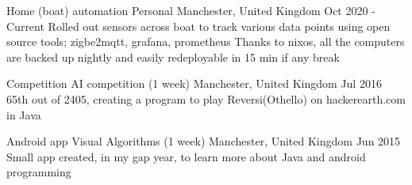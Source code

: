 \documentclass{my_cv}
\begin{document}


\experianceDetails
{Home (boat) automation}
{Personal}
{}
{Manchester, United Kingdom}
{Oct 2020 - Current}
\workdetails
{Rolled out sensors across boat to track various data points using open source tools; zigbe2mqtt, grafana, prometheus}
{Thanks to nixos, all the computers are backed up nightly and easily redeployable in 15 min if any break}
\stopworkdetails






\experianceDetails
{Competition}
{AI competition}
{(1 week)}
{Manchester, United Kingdom}
{Jul 2016}
\workdetails
{65th out of 2405, creating a program to play Reversi(Othello) on hackerearth.com in Java}
\stopworkdetails

\experianceDetails
{Android app}
{Visual Algorithms}
{(1 week)}
{Manchester, United Kingdom}
{Jun 2015}
\workdetails
{Small app created, in my gap year, to learn more about Java and android programming}
\stopworkdetails
\end{document}
